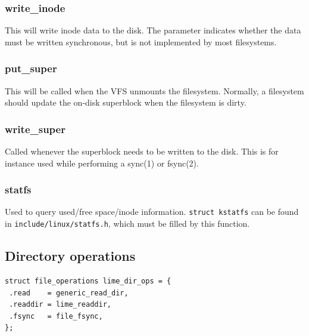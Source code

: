 \subsubsection{write\_inode}


This will write inode data to the disk. The parameter indicates whether the data must be written synchronous, but is not implemented by most filesystems.

\subsubsection{put\_super}


This will be called when the VFS unmounts the filesystem. Normally, a filesystem should update the on-disk superblock when the filesystem is dirty.

\subsubsection{write\_super}


Called whenever the superblock needs to be written to the disk. This is for instance used while performing a sync(1) or fsync(2).

\subsubsection{statfs}


Used to query used/free space/inode information. \texttt{struct kstatfs} can be found in \texttt{include/linux/statfs.h}, which must be filled by this function.

\subsection{Directory operations}
\label{dirops}

\begin{verbatim}
struct file_operations lime_dir_ops = {
 .read    = generic_read_dir,
 .readdir = lime_readdir,
 .fsync   = file_fsync,
};
\end{verbatim}

